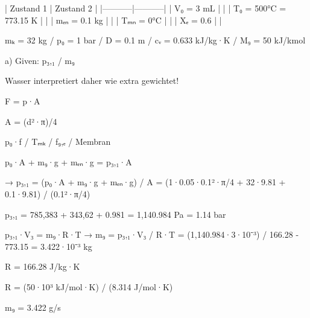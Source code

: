 | Zustand 1 | Zustand 2 |
|-----------|-----------|
| V₀ = 3 mL |           |
| T₀ = 500°C = 773.15 K |           |
| mₑₙ = 0.1 kg |           |
| Tₘₙ = 0°C |           |
| Xₑ = 0.6 |           |

mₖ = 32 kg / p₀ = 1 bar / D = 0.1 m / cᵥ = 0.633 kJ/kg·K / M₉ = 50 kJ/kmol

a) Given: p₃,₁ / m₉

Wasser interpretiert daher wie extra gewichtet!

F = p·A

A = (d²·π)/4

p₀·f / Tₘₖ / f₉,ₑ / Membran

p₀·A + m₉·g + mₑₙ·g = p₃,₁·A

→ p₃,₁ = (p₀·A + m₉·g + mₑₙ·g) / A = (1·0.05·0.1²·π/4 + 32·9.81 + 0.1·9.81) / (0.1²·π/4)

p₃,₁ = 785,383 + 343,62 + 0.981 = 1,140.984 Pa = 1.14 bar

p₃,₁·V₃ = m₉·R·T → m₉ = p₃,₁·V₃ / R·T = (1,140.984·3·10⁻³) / 166.28 - 773.15 = 3.422·10⁻³ kg

R = 166.28 J/kg·K

R = (50·10³ kJ/mol·K) / (8.314 J/mol·K)

m₉ = 3.422 g/s